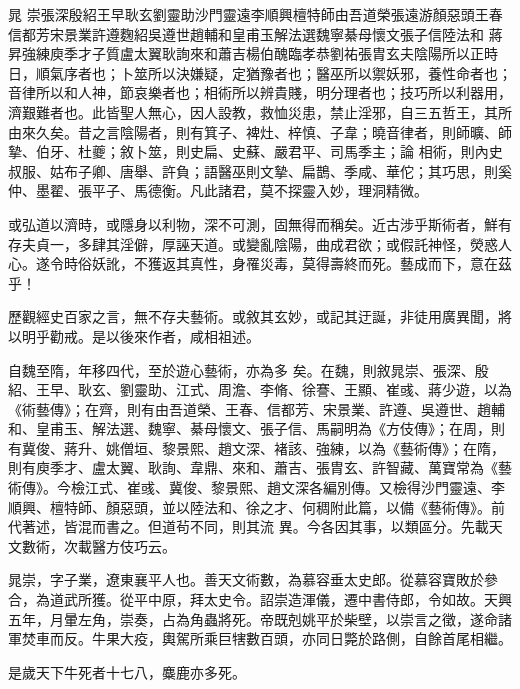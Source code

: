 
\begin{pinyinscope}

 晁
 崇張深殷紹王早耿玄劉靈助沙門靈遠李順興檀特師由吾道榮張遠游顏惡頭王春信都芳宋景業許遵麴紹吳遵世趙輔和皇甫玉解法選魏寧綦母懷文張子信陸法和
 蔣昇強練庾季才子質盧太翼耿詢來和蕭吉楊伯醜臨孝恭劉祐張胄玄夫陰陽所以正時日，順氣序者也；卜筮所以決嫌疑，定猶豫者也；醫巫所以禦妖邪，養性命者也；音律所以和人神，節哀樂者也；相術所以辨貴賤，明分理者也；技巧所以利器用，濟艱難者也。此皆聖人無心，因人設教，救恤災患，禁止淫邪，自三五哲王，其所由來久矣。昔之言陰陽者，則有箕子、裨灶、梓慎、子韋；曉音律者，則師曠、師摯、伯牙、杜夔；敘卜筮，則史扁、史蘇、嚴君平、司馬季主；論
 相術，則內史叔服、姑布子卿、唐舉、許負；語醫巫則文摯、扁鵲、季咸、華佗；其巧思，則奚仲、墨翟、張平子、馬德衡。凡此諸君，莫不探靈入妙，理洞精微。



 或弘道以濟時，或隱身以利物，深不可測，固無得而稱矣。近古涉乎斯術者，鮮有存夫貞一，多肆其淫僻，厚誣天道。或變亂陰陽，曲成君欲；或假託神怪，熒惑人心。遂令時俗妖訛，不獲返其真性，身罹災毒，莫得壽終而死。藝成而下，意在茲乎！



 歷觀經史百家之言，無不存夫藝術。或敘其玄妙，或記其迂誕，非徒用廣異聞，將以明乎勸戒。是以後來作者，咸相祖述。



 自魏至隋，年移四代，至於遊心藝術，亦為多
 矣。在魏，則敘晁崇、張深、殷紹、王早、耿玄、劉靈助、江式、周澹、李脩、徐謇、王顯、崔彧、蔣少遊，以為《術藝傳》；在齊，則有由吾道榮、王春、信都芳、宋景業、許遵、吳遵世、趙輔和、皇甫玉、解法選、魏寧、綦母懷文、張子信、馬嗣明為《方伎傳》；在周，則有冀俊、蔣升、姚僧垣、黎景熙、趙文深、褚該、強練，以為《藝術傳》；在隋，則有庾季才、盧太翼、耿詢、韋鼎、來和、蕭吉、張胄玄、許智藏、萬寶常為《藝術傳》。今檢江式、崔彧、冀俊、黎景熙、趙文深各編別傳。又檢得沙門靈遠、李順興、檀特師、顏惡頭，並以陸法和、徐之才、何稠附此篇，以備《藝術傳》。前代著述，皆混而書之。但道茍不同，則其流
 異。今各因其事，以類區分。先載天文數術，次載醫方伎巧云。



 晁崇，字子業，遼東襄平人也。善天文術數，為慕容垂太史郎。從慕容寶敗於參合，為道武所獲。從平中原，拜太史令。詔崇造渾儀，遷中書侍郎，令如故。天興五年，月暈左角，崇奏，占為角蟲將死。帝既剋姚平於柴壁，以崇言之徵，遂命諸軍焚車而反。牛果大疫，輿駕所乘巨犗數百頭，亦同日斃於路側，自餘首尾相繼。



 是歲天下牛死者十七八，麋鹿亦多死。




\end{pinyinscope}
